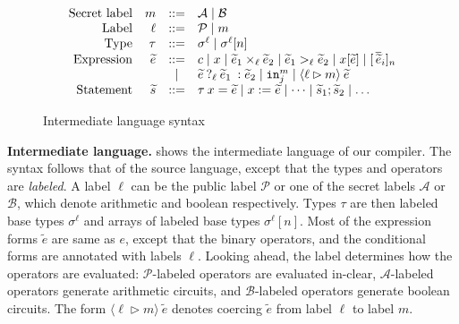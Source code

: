 \newcommand{\lcond}[4]{\ensuremath{{{#2}\:?_{{#1}}\:{#3}\::{#4}}}}

\begin{figure}[htp]
  \footnotesize
  \[
  \begin{array}{rrcl}
    \ftext{Secret label} & m &::=& \mathcal{A} \mid \mathcal{B}\\
    \ftext{Label} & \ell &::=& \mathcal{P} \mid m\\
    \ftext{Type} & \tau &::=& \sigma^{\ell} \mid \sigma^{\ell}[n]\\
    \ftext{Expression} & \widetilde{e} &::=& c \mid x \mid \widetilde{e}_{1} \mulop_{\ell} \widetilde{e}_{2} \mid \widetilde{e}_{1} >_{\ell} \widetilde{e}_{2} \mid x[\widetilde{e}] \mid [\,\overline{\widetilde{e}}_{i}]_{n} \\
    & & \mid & \lcond{\ell}{{\widetilde{e}}}{{\widetilde{e}}_{1}}{{\widetilde{e}}_{2}} \mid \kw{in}^{m}_{j} \mid \langle \ell \rhd m \rangle\:\widetilde{e}\\
    \ftext{Statement} & \widetilde{s} &::=& \tau\:x = \widetilde{e} \mid x := \widetilde{e} \mid \dots \mid \widetilde{s}_{1}; \widetilde{s}_{2} \mid \dots\\
  \end{array}
  \]
\caption{Intermediate language syntax}
\label{fig:interlang}
\end{figure}

\noindent\textbf{Intermediate language.}  shows the
intermediate language of our compiler. The syntax follows that of the source
language, except that the types and operators are \emph{labeled}. 
A label $\ell$ can be the  public label $\mathcal{P}$ or  one of the secret labels $\mathcal{A}$ or
$\mathcal{B}$, which denote arithmetic and boolean respectively.
Types $\tau$ are then
labeled base types $\sigma^{\ell}$ and arrays of labeled base types
$\sigma^{\ell}[n]$.
Most of the expression forms $\widetilde{e}$ are same as $e$, except
that the binary operators, and the conditional forms
are annotated with labels $\ell$.
Looking ahead, the label determines how the operators are
evaluated: $\mathcal{P}$-labeled operators are evaluated in-clear, $\mathcal{A}$-labeled operators generate arithmetic circuits, and
$\mathcal{B}$-labeled operators generate boolean circuits. The
form $\langle \ell \rhd m \rangle\:\widetilde{e}$ denotes coercing
$\widetilde{e}$ from label $\ell$ to label $m$.

